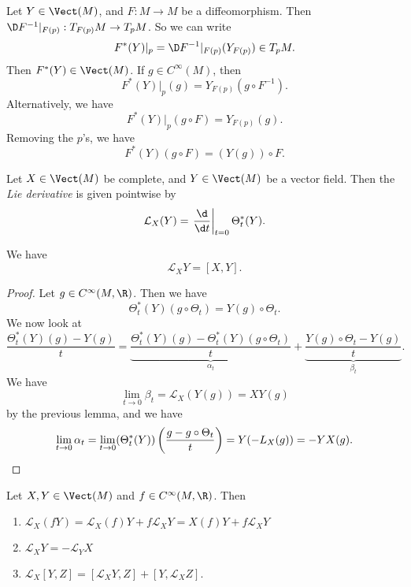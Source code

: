 \documentclass[a4paper]{article}
\begin{document}
\begin{notation}
  Let $Y \in \Vect(M)$, and $F: M \to M$ be a diffeomorphism. Then $\D F^{-1}|_{F(p)}: T_{F(p)} M \to T_pM$. So we can write
  \[
    F^*(Y)|_p = \D F^{-1}|_{F(p)}(Y_{F(p)}) \in T_p M.
  \]
  Then $F^*(Y) \in \Vect(M)$. If $g \in C^\infty(M)$, then
  \[
    F^*(Y)|_p(g) = Y_{F(p)} (g \circ F^{-1}).
  \]
  Alternatively, we have
  \[
    F^*(Y)|_p(g \circ F) = Y_{F(p)}(g).
  \]
  Removing the $p$'s, we have
  \[
    F^*(Y)(g \circ F) = (Y(g)) \circ F.
  \]
\end{notation}

\begin{defi}
  Let $X \in \Vect(M)$ be complete, and $Y \in \Vect(M)$ be a vector field. Then the \emph{Lie derivative} is given pointwise by
  \[
    \mathcal{L}_X(Y) = \left.\frac{\d}{\d t}\right|_{t = 0} \Theta_t^*(Y).
  \]
\end{defi}

\begin{lemma}
  We have
  \[
    \mathcal{L}_X Y = [X, Y].
  \]
\end{lemma}

\begin{proof}
  Let $g \in C^\infty(M, \R)$. Then we have
  \[
    \Theta_t^*(Y)(g \circ \Theta_t) = Y(g) \circ \Theta_t.
  \]
  We now look at
  \[
    \frac{\Theta_t^* (Y)(g) - Y(g)}{t} = \underbrace{\frac{\Theta_t^*(Y)(g) - \Theta_t^*(Y)(g \circ \Theta_t)}{t}}_{\alpha_t} + \underbrace{\frac{Y(g) \circ \Theta_t - Y(g)}{t}}_{\beta_t}.
  \]
  We have
  \[
    \lim_{t \to 0} \beta_t = \mathcal{L}_X (Y(g)) = XY(g)
  \]
  by the previous lemma, and we have
  \[
    \lim_{t\to 0}\alpha_t = \lim_{t \to 0} (\Theta_t^*(Y))\left(\frac{g - g \circ \Theta_t}{t}\right) = Y(-L_X(g)) = - YX(g). \qedhere
  \]
\end{proof}

\begin{cor}
  Let $X, Y \in \Vect(M)$ and $f \in C^\infty(M, \R)$. Then
  \begin{enumerate}
    \item $\mathcal{L}_X(fY) = \mathcal{L}_X(f) Y + f \mathcal{L}_X Y = X(f) Y + f \mathcal{L}_X Y$
    \item $\mathcal{L}_X Y = - \mathcal{L}_Y X$
    \item $\mathcal{L}_X[Y, Z] = [\mathcal{L}_X Y, Z] + [Y, \mathcal{L}_X Z]$.
  \end{enumerate}
\end{cor}
\end{document}
